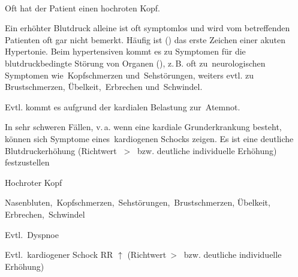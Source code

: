 \begin{Synopsis}
\end{Synopsis}


\TextSlide
{\TxABCDE}
{~
\begin{ABCDEText}
  \item[\ABCDE{2}] Oft hat der Patient einen
  hochroten Kopf.
  \item[\ABCDE{4}] Ein erhöhter Blutdruck alleine ist oft symptomlos und wird
vom betreffenden Patienten oft gar nicht bemerkt. Häufig ist
 () das
  erste Zeichen einer akuten Hypertonie. Beim
  hypertensiven  kommt es zu Symptomen für die
  blutdruckbedingte Störung von Organen
  (), z.\,B. oft zu {\RedFlag\,}neurologischen
  Symptomen wie {\RedFlag\,}Kopfschmerzen und {\RedFlag\,}Sehstörungen, weiters
  evtl. zu {\RedFlag\,}Brustschmerzen, Übelkeit,
  {\RedFlag\,}Erbrechen und {\RedFlag\,}Schwindel.
  \item[\ABCDE{B}] Evtl. kommt es aufgrund der kardialen Belastung zur {\RedFlag\,}Atemnot.
  \item[\ABCDE{C}] In sehr schweren Fällen, v.\,a. wenn eine
  kardiale Grunderkrankung besteht, können sich Symptome
  eines {\RedFlag\,}kardiogenen Schocks zeigen.
  Es ist eine deutliche Blutdruckerhöhung
  (Richtwert ~{\textgreater}~
  bzw. deutliche individuelle Erhöhung) festzustellen
\end{ABCDEText}
}
{
\begin{ABCDESlide}
  \item[\ABCDE{2}] Hochroter Kopf 
  \item[\ABCDE{4}] Nasenbluten, {\RedFlag\,}Kopfschmerzen, {\RedFlag\,}Sehstörungen, 
  {\RedFlag\,}Brustschmerzen, Übelkeit, {\RedFlag\,}Erbrechen, {\RedFlag\,}Schwindel
  \item[\ABCDE{B}] Evtl. {\RedFlag\,}Dyspnoe
  \item[\ABCDE{C}] Evtl. {\RedFlag\,}kardiogener Schock
  RR $\uparrow$ (Richtwert~{\textgreater}~ 
  bzw. deutliche individuelle Erhöhung)
\end{ABCDESlide}
}
{}
{}
{}

